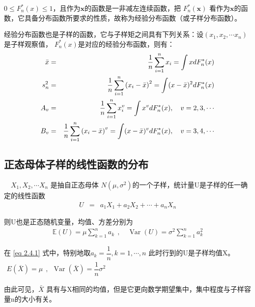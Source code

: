         $ 0\le F_{n}^{*}(x)\le 1 $，且作为$ \boldsymbol{x} $的函数是一非减左连续函数，把 $  F_{n}^{*}( \boldsymbol{x}) $
        看作为$  \boldsymbol{x} $的函数，它具备分布函数所要求的性质，故称为经验分布函数（或子样分布函数）。
		
		经验分布函数也是子样的函数，它与子样矩之间具有下列关系：设$  (x_{1}, x_{2}, \cdots x_{n})  $  是子样观察值， $  F_{n}^{*}(x) $是对应的经验分布函数，则有：
		\begin{eqnarray}
			\bar{x}   & = & \frac{1}{n} \sum_{i  =  1}^{n} x_{i}  =  \int x d F_{n}^{*}(x) \notag \\
			s_{n}^{2} & = & \frac{1}{n} \sum_{i  =  1}^{n}\left(x_{i}-\bar{x}\right)^{2} = \int(x-\bar{x})^{2} d F_{n}^{*}(x) \notag \\
			A_{v}     & = & \frac{1}{n} \sum_{i  =  1}^{n} x_{i}^{v}  =  \int x^{v} d F_{n}^{*}(x), \quad v  =  2,3, \cdots \notag \\
			B_{v}     & = & \frac{1}{n} \sum_{i  =  1}^{n}\left(x_{i}-\bar{x}\right)^{v} =  \int(x-\bar{x})^{v} d F_{n}^{*}(x), \quad v  = 3,4, \cdots  \notag
		\end{eqnarray}
		
\subsection{正态母体子样的线性函数的分布}

	\begin{theorem}
	\ \ $  X_{1}, X_{2}, \cdots X_{n}  $ 是抽自正态母体 $ N(\mu , \sigma^{2}) $的一个子样，统计量U是子样的任一确定的线性函数
		\begin{eqnarray}
			U & = & a_{1} X_{1}+a_{2} X_{2}+\cdots+a_{n} X_{n} \label{eq 2.4.1}
		\end{eqnarray}
	\end{theorem}

	
	则U也是正态随机变量，均值、方差分别为
	\begin{eqnarray}
		\mathbb{E}(U)  =  \mu \sum_{k  =  1}^{n} a_{k}\ \ , \quad\operatorname{Var}(U)  =  \sigma^{2} \sum_{k  =  1}^{n} a_{k}^{2}
	\end{eqnarray}
	
	在 \eqref{eq 2.4.1} 式中，特别地取$ a_{k}=\dfrac{1}{n}, k=1, \cdots, n $ 此时行到的U是子样均值X。$ \begin{array}{c}
	E(\overline {X})=\mu \ \ ,\ \ \operatorname{Var}(\overline{X})=\dfrac{1}{n} \sigma^{2}
	\end{array} $
	
	由此可见，$ \bar{X}$ 具有与X相同的均值，但是它更向数学期望集中，集中程度与子样容量n的大小有关。
	
